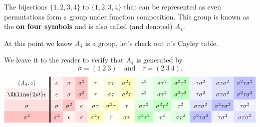 \documentclass{ximera}
\begin{document}
\begin{example}
  The bijections $\{1,2,3,4\}$ to $\{1,2,3,4\}$ that can be represented
  as even permutations form a group under function composition. This
  group is known as the \textbf{ on four symbols} and is
  also called (and denoted) $A_4$.


  At this point we know $A_4$ is a group, let's check out it's Cayley
  table.

  We leave it to the reader to verify that $A_4$ is generated by
  \[
  \sigma=(1\ 2\ 3)\quad \text{and}\quad \tau = (2\ 3\ 4).
  \]
  \begin{gather*}
    \renewcommand{\arraystretch}{1.6}
      \begin{array}{c!{\vline width 2pt}cccccccccccc}
      (A_{4},\circ)& e\cellcolor{red!6!white}     & \sigma\cellcolor{red!12!white}     & \sigma^2\cellcolor{red!24!white}   & \tau \cellcolor{yellow!6!white}    & \sigma\tau \cellcolor{yellow!12!white}  & \sigma^2 \tau\cellcolor{yellow!24!white} & \tau^2\cellcolor{green!6!white}    &  \sigma \tau^2\cellcolor{green!12!white}  &  \sigma^2 \tau^2\cellcolor{green!24!white} & \tau\sigma^2 \cellcolor{blue!6!white} & \sigma\tau\sigma^2 \cellcolor{blue!12!white}& \sigma^2 \tau \sigma^2\cellcolor{blue!24!white}\\  \Xhline{2pt}
      e \cellcolor{red!6!white}         & e\cellcolor{red!6!white}         & \sigma\cellcolor{red!12!white}           & \sigma^2\cellcolor{red!24!white}   & \tau \cellcolor{yellow!6!white}    & \sigma\tau \cellcolor{yellow!12!white}  & \sigma^2 \tau\cellcolor{yellow!24!white} & \tau^2\cellcolor{green!6!white}    &  \sigma \tau^2\cellcolor{green!12!white}  &  \sigma^2 \tau^2\cellcolor{green!24!white} & \tau\sigma^2 \cellcolor{blue!6!white} & \sigma\tau\sigma^2 \cellcolor{blue!12!white}& \sigma^2 \tau \sigma^2\cellcolor{blue!24!white}\\ 
      \sigma\cellcolor{red!12!white}         & \sigma\cellcolor{red!12!white}        & \sigma^2\cellcolor{red!24!white}            & e\cellcolor{red!6!white}     & \sigma\tau\cellcolor{yellow!12!white} & \sigma^2\tau \cellcolor{yellow!24!white}    & \tau \cellcolor{yellow!6!white}   & \sigma\tau^2 \cellcolor{green!12!white}  & \sigma^2\tau^2 \cellcolor{green!24!white} & \tau^2 \cellcolor{green!6!white} & \sigma \tau\sigma^2 \cellcolor{blue!12!white} & \sigma^2 \tau\sigma^2 \cellcolor{blue!24!white} & \tau\sigma^2 \cellcolor{blue!6!white}\\  
      \sigma^2\cellcolor{red!24!white}       & \sigma^2\cellcolor{red!24!white}      & e\cellcolor{red!6!white}           & \sigma\cellcolor{red!12!white}    & \sigma^2 \tau \cellcolor{yellow!24!white}   & \tau \cellcolor{yellow!6!white} & \sigma\tau \cellcolor{yellow!12!white}   &  \sigma^2\tau^2 \cellcolor{green!24!white}  & \tau^2 \cellcolor{green!6!white} & \sigma\tau^2\cellcolor{green!12!white}  & \sigma^2\tau\sigma^2\cellcolor{blue!24!white} & \tau\sigma^2\cellcolor{blue!6!white} & \sigma\tau\sigma^2\cellcolor{blue!12!white}\\  

\end{array}
\end{gather*}
\end{example}
\end{document}
